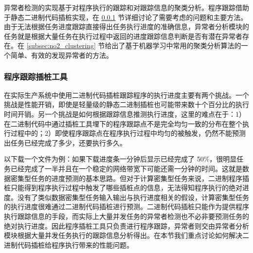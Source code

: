 异常者检测的实现基于对程序执行的跟踪和对跟踪信息的聚类分析。程序跟踪借助于静态二进制代码插桩实现，在 \ref{subsec:no2_inst} 节详细讨论了需要考虑的问题和主要方法。由于无法根据任务进度跟踪直接得出任务执行进度的准确信息，异常者分析模块的任务就是根据大量任务在执行过程中返回的进度跟踪信息判断是否有潜在异常者存在。在 \ref{subsec:no2_clustering} 节给出了基于机器学习中常用的聚类分析算法的一个简单、有效的发现异常者的方法。

\subsubsection{程序跟踪插桩工具}
\label{subsec:no2_inst}
在实际生产系统中使用二进制代码插桩跟踪程序的执行进度主要有两个挑战。一个挑战是性能开销，即使是轻量级的静态二进制插桩也可能带来数十个百分比的执行时间开销。另一个挑战是如何根据跟踪信息推测执行进度，这里的难点在于：1）在二进制代码中通过插桩工具埋下的程序跟踪点不是完全均匀一致的分布在整个执行过程中的；2）即使程序跟踪点在程序执行过程中均匀的被触发，仍然不能预测出任务已经完成了多少，还要执行多久。

以下载一个文件为例：如果下载进度条一分钟后显示已经完成了 50\%，很明显任务已经完成了一半并且在一个稳定的网络带宽下可能还需一分钟的时间。这就是数据密集型任务的进度预测的基本思路。但对于计算密集型任务来说，二进制程序插桩只能得到程序执行过程中触发了哪些插桩点的信息，无法得知程序执行的绝对进度。没有了类似数据密集型任务输入输出与执行进度相关的假设，计算密集型任务的执行进度很难通过二进制代码插桩进行预测。二进制代码插桩只能作为提供程序执行跟踪信息的手段，而实际上大量并发任务的异常者检测也不必非要预测任务的绝对执行进度。因此程序插桩工具只负责进行程序跟踪，异常者则交由异常者分析模块根据大量并发任务执行的跟踪信息分析得出。在本节我们重点讨论如何解决二进制代码插桩给程序执行带来的性能问题。

